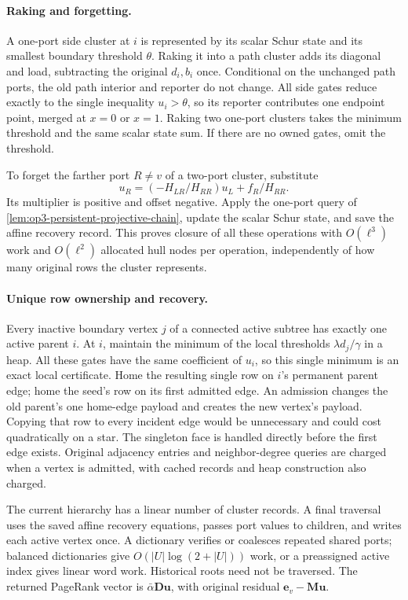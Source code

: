 \paragraph{Raking and forgetting.}
A one-port side cluster at $i$ is represented by its scalar Schur state and
its smallest boundary threshold $\theta$. Raking it into a path cluster adds
its diagonal and load, subtracting the original $d_i,b_i$ once. Conditional
on the unchanged path ports, the old path interior and reporter do not
change. All side gates reduce exactly to the single inequality $u_i>\theta$,
so its reporter contributes one endpoint point, merged at $x=0$ or $x=1$.
Raking two one-port clusters takes the minimum threshold and the same scalar
state sum. If there are no owned gates, omit the threshold.

To forget the farther port $R\ne v$ of a two-port cluster, substitute
\[
 u_R=(-H_{LR}/H_{RR})u_L+f_R/H_{RR}.
\]
Its multiplier is positive and offset negative. Apply the one-port query of
\cref{lem:op3-persistent-projective-chain}, update the scalar Schur state,
and save the affine recovery record. This proves closure of all these
operations with $O(\ell^3)$ work and $O(\ell^2)$ allocated hull nodes per
operation, independently of how many original rows the cluster represents.

\paragraph{Unique row ownership and recovery.}
Every inactive boundary vertex $j$ of a connected active subtree has exactly
one active parent $i$. At $i$, maintain the minimum of the local thresholds
$\lambda d_j/\gamma$ in a heap. All these gates have the same coefficient
of $u_i$, so this single minimum is an exact local certificate. Home the
resulting single row on $i$'s permanent parent edge; home the seed's row on
its first admitted edge. An admission changes the old parent's one home-edge
payload and creates the new vertex's payload. Copying that row to every
incident edge would be unnecessary and could cost quadratically on a star.
The singleton face is handled directly before the first edge exists.
Original adjacency entries and neighbor-degree queries are charged when a
vertex is admitted, with cached records and heap construction also charged.

The current hierarchy has a linear number of cluster records. A final
traversal uses the saved affine recovery equations, passes port values to
children, and writes each active vertex once. A dictionary verifies or
coalesces repeated shared ports; balanced dictionaries give $O(|U|\log(2+|U|))$
work, or a preassigned active index gives linear word work. Historical roots
need not be traversed. The returned PageRank vector is
$\bar\alpha\boldsymbol D\boldsymbol u$, with original residual
$\boldsymbol e_v-\boldsymbol M\boldsymbol u$.

